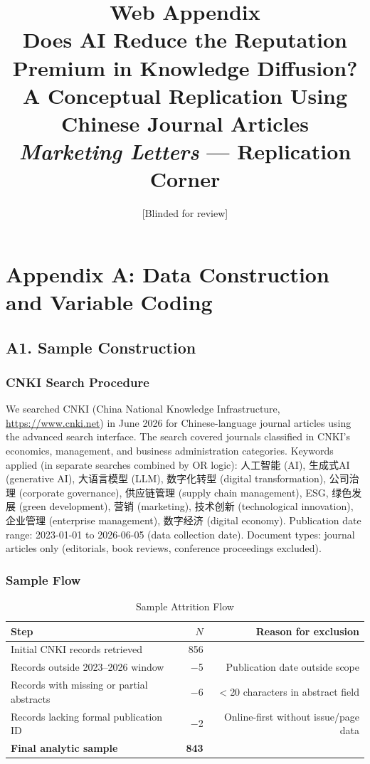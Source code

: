 \documentclass[12pt,a4paper]{article}
\title{\textbf{Web Appendix}\\[0.4em]
\normalsize Does AI Reduce the Reputation Premium in Knowledge Diffusion?\\
A Conceptual Replication Using Chinese Journal Articles\\[0.4em]
\textit{Marketing Letters} --- Replication Corner}
\author{[Blinded for review]}
\date{}
\begin{document}
\maketitle
\tableofcontents
\newpage

\section*{Appendix A: Data Construction and Variable Coding}

\subsection*{A1. Sample Construction}

\subsubsection*{CNKI Search Procedure}

We searched CNKI (China National Knowledge Infrastructure,
\url{https://www.cnki.net}) in June 2026 for Chinese-language journal
articles using the advanced search interface.
The search covered journals classified in CNKI's economics, management,
and business administration categories.
Keywords applied (in separate searches combined by OR logic):
人工智能 (AI), 生成式AI (generative AI), 大语言模型 (LLM), 数字化转型
(digital transformation), 公司治理 (corporate governance),
供应链管理 (supply chain management), ESG, 绿色发展 (green development),
营销 (marketing), 技术创新 (technological innovation),
企业管理 (enterprise management), 数字经济 (digital economy).
Publication date range: 2023-01-01 to 2026-06-05 (data collection date).
Document types: journal articles only (editorials, book reviews,
conference proceedings excluded).

\subsubsection*{Sample Flow}

\begin{table}[htbp]
\centering
\caption{Sample Attrition Flow}
\label{tab:flow}
\begin{tabular}{lrr}
\toprule
Step & $N$ & Reason for exclusion \\
\midrule
Initial CNKI records retrieved & 856 & \\
Records outside 2023--2026 window & $-$5 & Publication date outside scope \\
Records with missing or partial abstracts & $-$6 & $<$20 characters in abstract field \\
Records lacking formal publication ID & $-$2 & Online-first without issue/page data \\
\midrule
\textbf{Final analytic sample} & \textbf{843} & \\
\bottomrule
\end{tabular}
\end{table}
\end{document}
